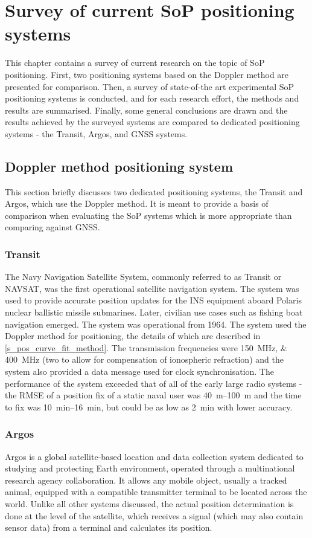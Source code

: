 \chapter{Survey of current SoP positioning systems}
\label{s_sop}
This chapter contains a survey of current research on the topic of SoP positioning. First, two positioning systems based on the Doppler method are presented for comparison. Then, a survey of state-of-the art experimental SoP positioning systems is conducted, and for each research effort, the methods and results are summarised. Finally, some general conclusions are drawn and the results achieved by the surveyed systems are compared to dedicated positioning systems - the Transit, Argos, and GNSS systems.



\section{Doppler method positioning system}
\label{s_sop_dopp_systems}
This section briefly discusses two dedicated positioning systems, the Transit and Argos, which use the Doppler method. It is meant to provide a basis of comparison when evaluating the SoP systems which is more appropriate than comparing against GNSS.


\subsection{Transit}
The Navy Navigation Satellite System, commonly referred to as Transit or NAVSAT, was the first operational satellite navigation system. The system was used to provide accurate position updates for the INS equipment aboard Polaris nuclear ballistic missile submarines. Later, civilian use cases such as fishing boat navigation emerged. The system was operational from 1964. The system used the Doppler method for positioning, the details of which are described in \autoref{s_pos_curve_fit_method}. The transmission frequencies were \qtylist{150;400}{MHz} (two to allow for compensation of ionospheric refraction) and the system also provided a data message used for clock synchronisation. The performance of the system exceeded that of all of the early large radio systems - the RMSE of a position fix of a static naval user was \qtyrange{40}{100}{m} and the time to fix was \qtyrange{10}{16}{min}, but could be as low as \qty{2}{min} with lower accuracy\cite{sat16}.

\subsection{Argos}
Argos is a global satellite-based location and data collection system dedicated to studying and protecting Earth environment, operated through a multinational research agency collaboration. It allows any mobile object, usually a tracked animal, equipped with a compatible transmitter terminal to be located across the world\cite{sat17}. Unlike all other systems discussed, the actual position determination is done at the level of the satellite, which receives a signal (which may also contain sensor data) from a terminal and calculates its position.

